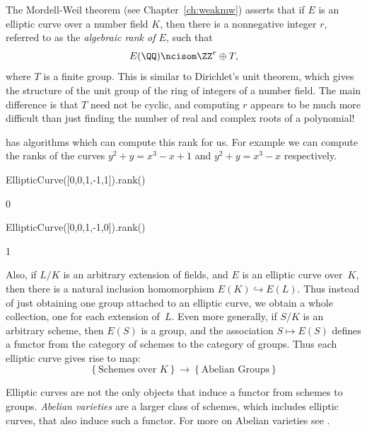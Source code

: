 The Mordell-Weil theorem (see Chapter~\ref{ch:weakmw}) asserts that if $E$ is
an elliptic curve over a number field $K$, then there is a nonnegative integer
$r$, referred to as the \emph{algebraic rank of $E$}, such that
\begin{equation}\label{eqn:mw}
  E(\QQ) \ncisom \ZZ^r \oplus T,
\end{equation}
where $T$ is a finite group.   This is similar to Dirichlet's unit theorem, which
gives the structure of the unit group of the ring of integers of a number field.
The main difference is that $T$ need not be cyclic, and computing $r$ appears to
be much more difficult than just finding the number of real and complex roots of
a polynomial!

\begin{example}
  {\Sage} has algorithms which can compute this rank for us.
  For example we can compute the ranks of the curves
  $y^2 + y = x^3 - x + 1$ and $y^2 + y = x^3 - x$ respectively.
\begin{sagecode}
\begin{sagecell}
EllipticCurve([0,0,1,-1,1]).rank()
\end{sagecell}
\begin{sageout}
0
\end{sageout}
\begin{sagecell}
EllipticCurve([0,0,1,-1,0]).rank()
\end{sagecell}
\begin{sageout}
1
\end{sageout}
\end{sagecode}
\end{example}

Also, if $L/K$ is an arbitrary extension of fields, and $E$ is an
elliptic curve over~$K$, then there is a natural inclusion
homomorphism $E(K) \hookrightarrow E(L)$.
Thus instead of just obtaining one group
attached to an elliptic curve, we obtain a whole collection, one for
each extension of~$L$.  Even more generally, if $S/K$ is an arbitrary
scheme, then $E(S)$ is a group, and the association $S \mapsto E(S)$
defines a functor from the category of schemes to the category of
groups.  Thus each elliptic curve gives rise to map:
\[
\left\{\text{Schemes over $K$}\right\}
\longrightarrow
\left\{\text{Abelian Groups}\right\}
\]

\begin{remark}
  Elliptic curves are not the only objects that induce
  a functor from schemes to groups.
  \emph{Abelian varieties} are a larger class of
  schemes, which includes elliptic curves,
  that also induce such a functor.
  For more on Abelian varieties see
  \cite{milne:abvars}.
\end{remark}

